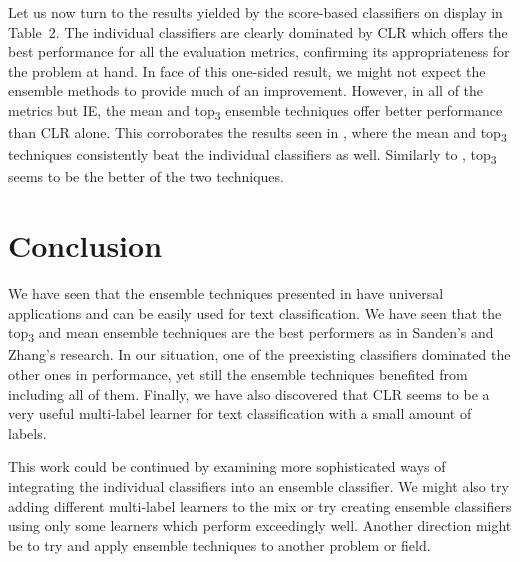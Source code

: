 Let us now turn to the results yielded by the score-based classifiers
on display in Table~2. The individual classifiers are clearly
dominated by CLR which offers the best performance for all the
evaluation metrics, confirming its appropriateness for the problem at
hand. In face of this one-sided result, we might not expect the
ensemble methods to provide much of an improvement. However, in all of
the metrics but IE, the mean and top\textsubscript{3} ensemble
techniques offer better performance than CLR alone. This corroborates
the results seen in \cite{sanden2011enhancing}, where the mean and
top\textsubscript{3} techniques consistently beat the individual
classifiers as well. Similarly to \cite{sanden2011enhancing},
top\textsubscript{3} seems to be the better of the two techniques.

\section{Conclusion}
We have seen that the ensemble techniques presented in
\cite{sanden2011enhancing} have universal applications and can be
easily used for text classification. We have seen that the
top\textsubscript{3} and mean ensemble techniques are the best
performers as in Sanden's and Zhang's research. In our situation, one
of the preexisting classifiers dominated the other ones in
performance, yet still the ensemble techniques benefited from
including all of them. Finally, we have also discovered that CLR seems
to be a very useful multi-label learner for text classification with a
small amount of labels.

This work could be continued by examining more sophisticated ways of
integrating the individual classifiers into an ensemble classifier. We
might also try adding different multi-label learners to the mix or try
creating ensemble classifiers using only some learners which perform
exceedingly well. Another direction might be to try and apply ensemble
techniques to another problem or field.
